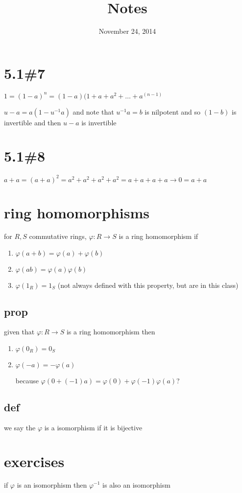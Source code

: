 \documentclass[letterpaper]{article}
\begin{document}
\title{Notes}
\date{November 24, 2014}
\maketitle
\section*{5.1\#7}
$1=(1-a)^n=(1-a)(1+a+a^2+\dots+a^(n-1)$

$u-a=a(1-u^{-1}a)$ and note that $u^{-1}a=b$ is nilpotent and so $(1-b)$ is invertible and then $u-a$ is invertible
\section*{5.1\#8}
$a+a=(a+a)^2=a^2+a^2+a^2+a^2=a+a+a+a\to0=a+a$

\section*{ring homomorphisms}
for $R,S$ commutative rings, $\varphi:R\to S$ is a ring homomorphism if
\begin{enumerate}
\item
$\varphi(a+b)=\varphi(a)+\varphi(b)$
\item
$\varphi(ab)=\varphi(a)\varphi(b)$
\item
$\varphi(1_R)=1_S$ (not always defined with this property, but are in this class)
\end{enumerate}

\subsection*{prop}
given that $\varphi:R\to S$ is a ring homomorphism then
\begin{enumerate}
\item
$\varphi(0_R)=0_S$
\item
$\varphi(-a)=-\varphi(a)$

because $\varphi(0+(-1)a)=\varphi(0)+\varphi(-1)\varphi(a)$?
\end{enumerate}

\subsection*{def}
we say the $\varphi$ is a isomorphism if it is bijective

\section*{exercises}
if $\varphi$ is an isomorphism then $\varphi^{-1}$ is also an isomorphism
\end{document}
